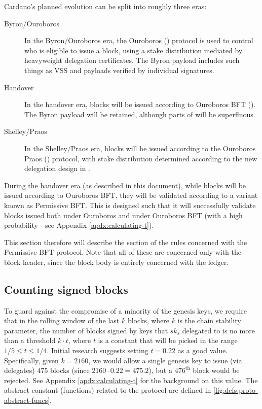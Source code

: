 \documentclass[11pt,a4paper]{article}
\newcommand{\type}[1]{\mathsf{#1}}
\begin{document}
Cardano's planned evolution can be split into roughly three eras:
\begin{description}
\item[Byron/Ouroboros] In the Byron/Ouroboros era, the Ouroboros (\cite{ouroboros})
  protocol is used to control who is eligible to issue a block, using a stake
  distribution mediated by heavyweight delegation certificates. The Byron
  payload includes such things as VSS and payloads verified by individual
  signatures.
\item[Handover] In the handover era, blocks will be issued according to
  Ouroboros BFT (\cite{ouroboros_bft}). The Byron payload will be retained, although
  parts of will be superfluous.
\item[Shelley/Praos] In the Shelley/Praos era, blocks will be issued according
  to the Ouroboros Praos (\cite{ouroboros_praos}) protocol, with stake distribution
  determined according to the new delegation design in \cite{delegation_design}.
\end{description}

During the handover era (as described in this document), while blocks will be
issued according to Ouroboros BFT, they will be validated according to a variant
known as Permissive BFT. This is designed such that it will successfully
validate blocks issued both under Ouroboros and under Ouroboros BFT (with a high
probability - see Appendix \ref{apdx:calculating-t}).

This section therefore will describe the section of the rules concerned with the
Permissive BFT protocol. Note that all of these are concerned only with the
block header, since the block body is entirely concerned with the ledger.

\subsection{Counting signed blocks}

\newcommand{\BSCEnv}{\type{BSCEnv}}
\newcommand{\BSCState}{\type{BSCState}}

To guard against the compromise of a minority of the genesis keys, we require
that in the rolling window of the last $k$ blocks, where $k$ is the chain
stability parameter, the number of blocks signed by keys that $sk_s$ delegated
to is no more than a threshold $k \cdot t$, where $t$ is a constant that will
be picked in the range $1/5 \leq t \leq 1/4$. Initial research suggests setting
$t=0.22$ as a good value. Specifically, given $k=2160$, we would allow a single
genesis key to issue (via delegates) $475$ blocks (since
$2160 \cdot 0.22 = 475.2$), but a $476^{\text{th}}$ block would be rejected.
See Appendix \ref{apdx:calculating-t} for the background on this value. The
abstract constant (functions) related to the protocol are defined in
\cref{fig:defs:proto-abstract-funcs}.
\end{document}
